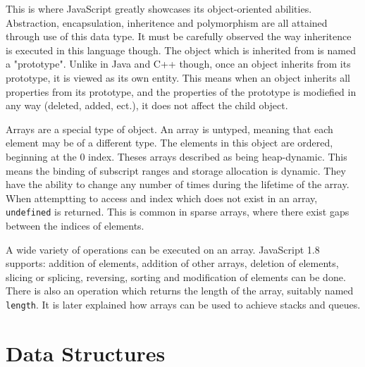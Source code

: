 \documentclass[man]{apa}
\begin{document}
This is where JavaScript greatly showcases its object-oriented abilities. Abstraction, encapsulation, inheritence and polymorphism are all attained through use of this data type. It must be carefully observed the way inheritence is executed in this language though. The object which is inherited from is named a "prototype". Unlike in Java and C++ though, once an object inherits from its prototype, it is viewed as its own entity. This means when an object inherits all properties from its prototype, and the properties of the prototype is modiefied in any way (deleted, added, ect.), it does not affect the child object.

Arrays are a special type of object. An array is untyped, meaning that each element may be of a different type. The elements in this object are ordered, beginning at the 0 index. Theses arrays described as being heap-dynamic. This means the binding of subscript ranges and storage allocation is dynamic. They have the ability to change any number of times during the lifetime of the array. When attemptting to access and index which does not exist in an array, \texttt{undefined} is returned. This is common in sparse arrays, where there exist gaps between the indices of elements.

A wide variety of operations can be executed on an array. JavaScript 1.8 supports: addition of elements, addition of other arrays, deletion of elements, slicing or splicing, reversing, sorting and modification of elements can be done. There is also an operation which returns the length of the array, suitably named \texttt{length}. It is later explained how arrays can be used to achieve stacks and queues. %

\section{Data Structures}
\end{document}
